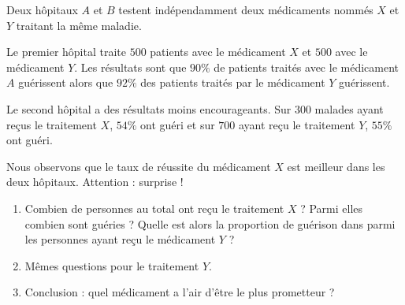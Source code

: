 
\begin{exercice}\label{exosmath-0090}

    Deux hôpitaux \( A\) et \( B\) testent indépendamment deux médicaments nommés \( X\) et \( Y\) traitant la même maladie.
    
    Le premier hôpital traite \( 500\) patients avec le médicament \( X\) et \( 500\) avec le médicament \( Y\). Les résultats sont que \( 90\%\) de patients traités avec le médicament \( A\) guérissent alors que \( 92\%\) des patients traités par le médicament \( Y\) guérissent.

    Le second hôpital a des résultats moins encourageants. Sur \( 300\) malades ayant reçus le traitement \( X\), \( 54\%\) ont guéri et sur \( 700\) ayant reçu le traitement \( Y\), \( 55\%\) ont guéri.

    Nous observons que le taux de réussite du médicament \( X\) est meilleur dans les deux hôpitaux. Attention : surprise !

    \begin{enumerate}
        \item
            Combien de personnes au total ont reçu le traitement $X$ ? Parmi elles combien sont guéries ? Quelle est alors la proportion de guérison dans parmi les personnes ayant reçu le médicament \( Y\) ?
        \item
            Mêmes questions pour le traitement \( Y\).
        \item
            Conclusion : quel médicament a l'air d'être le plus prometteur ?
    \end{enumerate}

\end{exercice}
